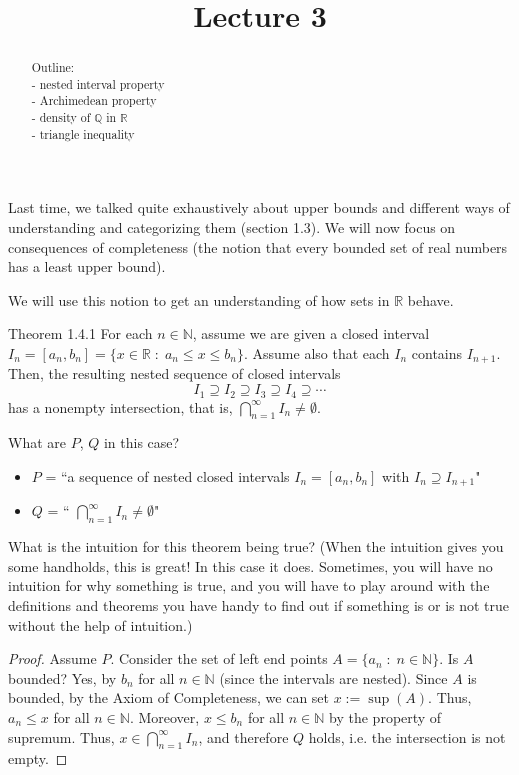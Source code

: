 \documentclass{ximera}
\begin{document}
    \title{Lecture 3}
    
    \begin{abstract}  
    Outline: \\
    - nested interval property \\
    - Archimedean property \\
    - density of $\mathbb{Q}$ in $\mathbb{R}$ \\
    - triangle inequality
\end{abstract}

\maketitle

Last time, we talked quite exhaustively about upper bounds and different ways of understanding and categorizing them (section 1.3).  We will now focus on consequences of completeness (the notion that every bounded set of real numbers has a least upper bound).

We will use this notion to get an understanding of how sets in $\mathbb{R}$ behave.  

\begin{theorem}{Theorem 1.4.1}
    For each $n \in \mathbb{N}$, assume we are given a closed interval $I_n = [a_n,b_n] = \{x \in \mathbb{R} \; : \; a_n \leq x \leq b_n\}$.  Assume also that each $I_n$ contains $I_{n+1}$.  Then, the resulting nested sequence of closed intervals
    \[I_1 \supseteq I_2 \supseteq I_3 \supseteq I_4 \supseteq \cdots\]
    has a nonempty intersection, that is, $\bigcap\limits_{n=1}^\infty I_n \neq \emptyset$.
\end{theorem}

What are $P$, $Q$ in this case?  
\begin{itemize}
    \item $P$ = ``a sequence of nested closed intervals $I_n = [a_n,b_n]$ with $I_n \supseteq I_{n+1}$"
    \item $Q$ = `` $\bigcap\limits_{n=1}^\infty I_n \neq \emptyset$"
\end{itemize}

What is the intuition for this theorem being true? (When the intuition gives you some handholds, this is great!  In this case it does. Sometimes, you will have no intuition for why something is true, and you will have to play around with the definitions and theorems you have handy to find out if something is or is not true without the help of intuition.)

\begin{proof}
    Assume $P$.  Consider the set of left end points $A = \{ a_n \; : \; n \in \mathbb{N}\}$.  Is $A$ bounded? Yes, by $b_n$ for all $n \in \mathbb{N}$ (since the intervals are nested).  Since $A$ is bounded, by the Axiom of Completeness, we can set $x := \sup(A)$.  Thus, $a_n \leq x$ for all $n \in \mathbb{N}$.  Moreover, $x \leq b_n$ for all $n \in \mathbb{N}$ by the property of supremum.  Thus, $x \in \bigcap\limits_{n=1}^\infty I_n$, and therefore $Q$ holds, i.e. the intersection is not empty.
\end{proof}
\end{document}
